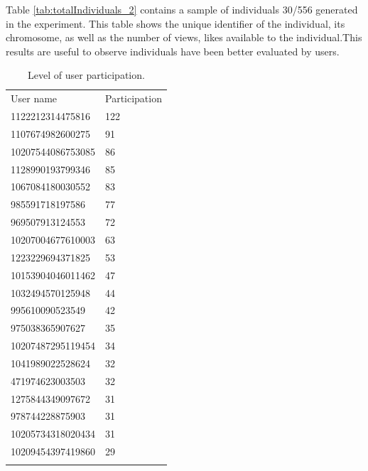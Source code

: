 Table \ref{tab:totalIndividuals_2} contains a sample of individuals 30/556
generated in the experiment. This table shows the unique identifier of the
individual, its chromosome, as well as the number of views, likes available to
the individual.This results are useful to observe individuals have been better
evaluated by users.

\begin{table}
\small
\caption{Level of user participation.}
\label{tab:userParticipation_2}
\centering
\small
\begin{tabular}{p{4cm} p{4cm}}
\hline\noalign{\smallskip}
 User name & Participation   \\
\noalign{\smallskip}\hline\noalign{\smallskip}
\small{1122212314475816} & \small{122} \\ \hline
\small{1107674982600275} & \small{91} \\ \hline
\small{10207544086753085} & \small{86} \\ \hline
\small{1128990193799346} & \small{85} \\ \hline
\small{1067084180030552} & \small{83} \\ \hline
\small{985591718197586} & \small{77} \\ \hline
\small{969507913124553} & \small{72} \\ \hline
\small{10207004677610003} & \small{63} \\ \hline
\small{1223229694371825} & \small{53} \\ \hline
\small{10153904046011462} & \small{47} \\ \hline
\small{1032494570125948} & \small{44} \\ \hline
\small{995610090523549} & \small{42} \\ \hline
\small{975038365907627} & \small{35} \\ \hline
\small{10207487295119454} & \small{34} \\ \hline
\small{1041989022528624} & \small{32} \\ \hline
\small{471974623003503} & \small{32} \\ \hline
\small{1275844349097672} & \small{31} \\ \hline
\small{978744228875903} & \small{31} \\ \hline
\small{10205734318020434} & \small{31} \\ \hline
\small{10209454397419860} & \small{29} \\ \hline


\noalign{\smallskip}\hline
\end{tabular}
\end{table}

